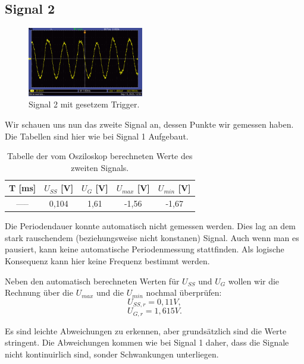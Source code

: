 
\subsection*{Signal 2}
\begin{figure} [h!]
    \centering
        \includegraphics[width=0.45\textwidth]{img/25/Signale2/Signal2-Clean.pdf}
    \caption{Signal 2 mit gesetzem Trigger.}
\end{figure}

Wir schauen uns nun das zweite Signal an, dessen Punkte wir gemessen haben. Die Tabellen sind hier wie bei Signal 1 Aufgebaut.

\begin{table}[h!]
    \centering
    \begin{tabular}{c | c | c | c | c }
        \toprule
        T [ms] & $U_{SS}$ [V] & $U_{G}$ [V] & $U_{max}$ [V] & $U_{min}$ [V] \\
        \hline
        ----- & 0,104 & 1,61 & -1,56 & -1,67 \\
        \bottomrule
    \end{tabular}
    \caption{Tabelle der vom Osziloskop berechneten Werte des zweiten Signals.}
    \label{tab:sig2_auto}
\end{table}

Die Periodendauer konnte automatisch nicht gemessen werden. Dies lag an dem stark rauschendem (beziehungsweise nicht konstanen) Signal. Auch wenn man es pausiert, kann keine automatische Periodenmessung stattfinden. Als logische Konsequenz kann hier keine Frequenz bestimmt werden.

Neben den automatisch berechneten Werten für $U_{SS}$ und $U_G$ wollen wir die Rechnung über die $U_{max}$ und die $U_{min}$ nochmal überprüfen:
\begin{equation}
    U_{SS,r} = 0,11 V,
\end{equation}
\begin{equation}
    U_{G,r} = 1,615 V.
\end{equation}

Es sind leichte Abweichungen zu erkennen, aber grundsätzlich sind die Werte stringent. Die Abweichungen kommen wie bei Signal 1 daher, dass die Signale nicht kontinuirlich sind, sonder Schwankungen unterliegen. 

